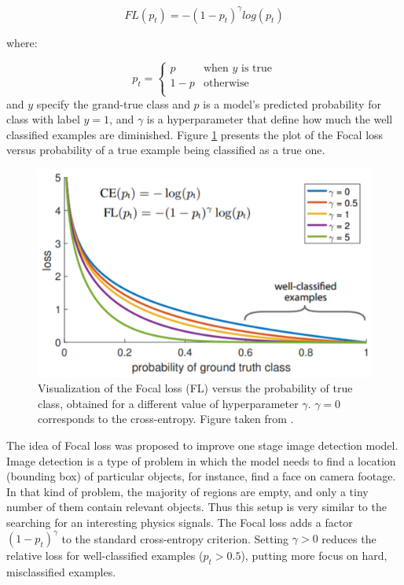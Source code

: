 \begin{equation}
FL(p_t) = -(1-p_t)^{\gamma}log(p_t)
\end{equation}

where:

\begin{equation}
    p_t = \left\{ \begin{array}{ll}
p & \textrm{when $y$ is true}\\
1-p & \textrm{otherwise}\\
\end{array} \right.
\end{equation}
and $y$ specify the grand-true class and $p$ is a model's predicted probability for class with label $y=1$, and $\gamma$ is a hyperparameter that define how much the well classified examples are diminished.  Figure \ref{fig:Focal loss} presents the plot of the Focal loss versus probability of a true example being classified as a true one.

 \begin{figure}[!h]
\centering
\includegraphics{figures/Focal_loss.png}
\caption{Visualization of the Focal loss (FL) versus the probability of true class, obtained for a different value of hyperparameter $\gamma$. $\gamma=0$ corresponds to the cross-entropy. Figure taken from \cite{focal_loss}. 
\label{fig:Focal loss}}
\end{figure}


The idea of Focal loss was proposed to improve one stage image detection model. Image detection is a type of problem in which the model needs to find a location (bounding box) of particular objects, for instance, find a face on camera footage. In that kind of problem, the majority of regions are empty, and only a tiny number of them contain relevant objects. Thus this setup is very similar to the searching for an interesting physics signals. The Focal loss adds a factor $(1 - p_t)^\gamma$ to the standard cross-entropy criterion. Setting $\gamma > 0$ reduces the relative loss for well-classified examples ($p_t > 0.5$), putting more focus on hard, misclassified examples.
 
